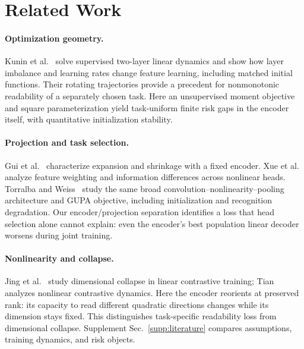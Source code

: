 \section{Related Work}
\label{main:related}
\paragraph{Optimization geometry.}
Kunin et al.~\cite{kunin2024rich} solve supervised two-layer linear dynamics and show how layer imbalance and learning rates change feature learning, including matched initial functions. Their rotating trajectories provide a precedent for nonmonotonic readability of a separately chosen task. Here an unsupervised moment objective and square parameterization yield task-uniform finite risk gaps in the encoder itself, with quantitative initialization stability.

\paragraph{Projection and task selection.}
Gui et al.~\cite{gui2023projection} characterize expansion and shrinkage with a fixed encoder. Xue et al.~\cite{xue2024benefits} analyze feature weighting and information differences across nonlinear heads. Torralba and Weiss~\cite{torralba2026theory} study the same broad convolution--nonlinearity--pooling architecture and GUPA objective, including initialization and recognition degradation. Our encoder/projection separation identifies a loss that head selection alone cannot explain: even the encoder's best population linear decoder worsens during joint training.

\paragraph{Nonlinearity and collapse.}
Jing et al.~\cite{jing2022collapse} study dimensional collapse in linear contrastive training; Tian~\cite{tian2023nonlinearity} analyzes nonlinear contrastive dynamics. Here the encoder reorients at preserved rank: its capacity to read different quadratic directions changes while its dimension stays fixed. This distinguishes task-specific readability loss from dimensional collapse. Supplement Sec.~\ref{supp:literature} compares assumptions, training dynamics, and risk objects.

